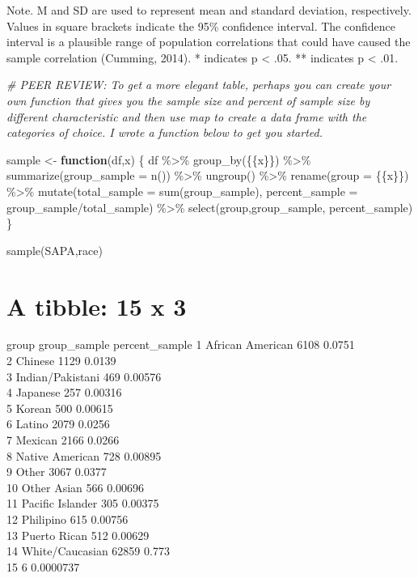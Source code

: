 \documentclass[
]{article}
\newenvironment{Shaded}{\begin{snugshade}}{\end{snugshade}}
\newcommand{\AttributeTok}[1]{\textcolor[rgb]{0.77,0.63,0.00}{#1}}
\newcommand{\CommentTok}[1]{\textcolor[rgb]{0.56,0.35,0.01}{\textit{#1}}}
\newcommand{\ControlFlowTok}[1]{\textcolor[rgb]{0.13,0.29,0.53}{\textbf{#1}}}
\newcommand{\FunctionTok}[1]{\textcolor[rgb]{0.00,0.00,0.00}{#1}}
\newcommand{\NormalTok}[1]{#1}
\newcommand{\OtherTok}[1]{\textcolor[rgb]{0.56,0.35,0.01}{#1}}
\newcommand{\SpecialCharTok}[1]{\textcolor[rgb]{0.00,0.00,0.00}{#1}}
\begin{document}
Note. M and SD are used to represent mean and standard deviation, respectively.
Values in square brackets indicate the 95\% confidence interval.
The confidence interval is a plausible range of population correlations
that could have caused the sample correlation (Cumming, 2014).
* indicates p \textless{} .05. ** indicates p \textless{} .01.

\begin{Shaded}
\begin{Highlighting}[]
\CommentTok{\# PEER REVIEW: To get a more elegant table, perhaps you can create your own function that gives you the sample size and percent of sample size by different characteristic and then use map to create a data frame with the categories of choice. I wrote a function below to get you started.}

\NormalTok{sample }\OtherTok{\textless{}{-}} \ControlFlowTok{function}\NormalTok{(df,x) \{}
\NormalTok{  df }\SpecialCharTok{\%\textgreater{}\%}
    \FunctionTok{group\_by}\NormalTok{(\{\{x\}\}) }\SpecialCharTok{\%\textgreater{}\%}
    \FunctionTok{summarize}\NormalTok{(}\AttributeTok{group\_sample =} \FunctionTok{n}\NormalTok{()) }\SpecialCharTok{\%\textgreater{}\%}
    \FunctionTok{ungroup}\NormalTok{() }\SpecialCharTok{\%\textgreater{}\%}
    \FunctionTok{rename}\NormalTok{(}\AttributeTok{group =}\NormalTok{ \{\{x\}\}) }\SpecialCharTok{\%\textgreater{}\%}
    \FunctionTok{mutate}\NormalTok{(}\AttributeTok{total\_sample =} \FunctionTok{sum}\NormalTok{(group\_sample),}
           \AttributeTok{percent\_sample =}\NormalTok{ group\_sample}\SpecialCharTok{/}\NormalTok{total\_sample) }\SpecialCharTok{\%\textgreater{}\%}
    \FunctionTok{select}\NormalTok{(group,group\_sample, percent\_sample)}
\NormalTok{\}}

\FunctionTok{sample}\NormalTok{(SAPA,race)}
\end{Highlighting}
\end{Shaded}

\hypertarget{a-tibble-15-x-3-1}{%
\section{A tibble: 15 x 3}\label{a-tibble-15-x-3-1}}

group group\_sample percent\_sample
1 African American 6108 0.0751\\
2 Chinese 1129 0.0139\\
3 Indian/Pakistani 469 0.00576\\
4 Japanese 257 0.00316\\
5 Korean 500 0.00615\\
6 Latino 2079 0.0256\\
7 Mexican 2166 0.0266\\
8 Native American 728 0.00895\\
9 Other 3067 0.0377\\
10 Other Asian 566 0.00696\\
11 Pacific Islander 305 0.00375\\
12 Philipino 615 0.00756\\
13 Puerto Rican 512 0.00629\\
14 White/Caucasian 62859 0.773\\
15 6 0.0000737
\end{document}
